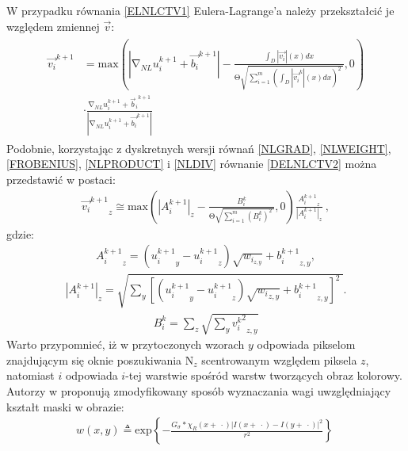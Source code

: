 \documentclass[12pt, twoside, openany]{report}
\theoremstyle{definition}
\begin{document}
W przypadku równania \eqref{ELNLCTV1} Eulera-Lagrange’a należy przekształcić je względem zmiennej $\overrightarrow{v}$:
\begin{align}
\begin{aligned}
{\overrightarrow{v_i}}^{k+1} &= \mathrm{max} \left(\left|{\mathrm{\nabla }}_{NL}u^{k+1}_i+{\overrightarrow{b_i}}^{k+1}\right|-\frac{\int_D{\left|\overrightarrow{v_i}\right|(x)}dx}{\mathrm{\Theta }\sqrt{\sum^m_{i=1}{{\left(\int_D{\left|{\overrightarrow{v_i}}^k\right|(x)}dx\right)}^2}\ }},0\right) \\ 
&\cdot \frac{{\mathrm{\nabla }}_{NL}u^{k+1}_i+{{\overrightarrow{b}}_i}^{k+1}}{\left|{\mathrm{\nabla }}_{NL}u^{k+1}_i+{\overrightarrow{b_i}}^{k+1}\right|}\ 
\label{DELNLCTV2}
\end{aligned}
\end{align}
Podobnie, korzystając z dyskretnych wersji równań \eqref{NLGRAD}, \eqref{NLWEIGHT}, \eqref{FROBENIUS}, \eqref{NLPRODUCT} i \eqref{NLDIV} równanie \eqref{DELNLCTV2} można przedstawić w postaci:
\begin{align}
{{\overrightarrow{v_i}}^{k+1}}_z \cong {\mathrm{max} \left({\left|A^{k+1}_i\right|}_z-\frac{B^k_i}{\mathrm{\Theta }\sqrt{\sum^m_{i=1}{{\left(B^k_i\right)}^2}\ }},0\right)\frac{{A^{k+1}_i}_z}{{\left|A^{k+1}_i\right|}_z}\ },
\label{VNLCTVITER}
\end{align}
gdzie:
\begin{align}
{A^{k+1}_i}_z=\left({u^{k+1}_i}_y-{u^{k+1}_i}_z\right)\sqrt{w_{i_{z,y}}}+{b^{k+1}_i}_{z,y},
\end{align} 
\begin{align}
{\left|A^{k+1}_i\right|}_z=\sqrt{\sum_y{{\left[\left({u^{k+1}_i}_y-{u^{k+1}_i}_z\right)\sqrt{{w_i}_{z,y}}+{b^{k+1}_i}_{z,y}\right]}^2}\ }.
\end{align}
\begin{align}
B^k_i=\sum_z{\sqrt{\sum_y{{{v^k_i}^2}_{z,y}}}}
\end{align}
Warto przypomnieć, iż w przytoczonych wzorach $y$ odpowiada pikselom znajdującym się oknie poszukiwania ${\mathrm{N}}_z$ scentrowanym względem piksela $z$, natomiast $i$ odpowiada $i$-tej warstwie spośród warstw tworzących obraz kolorowy. Autorzy w \cite{jung2011nonlocal} proponują zmodyfikowany sposób wyznaczania wagi uwzględniający kształt maski w obrazie:
\begin{align}
w\left(x,y\right)\triangleq {\mathrm{exp} \left\{-\frac{G_{\sigma }*{\chi }_R\left(x+\ \cdot \right){\left|I\left(x+\ \cdot \right)-I\left(y+\ \cdot \right)\right|}^2}{r^2}\right\}\ }
\label{NLWEIGHTMASK}
\end{align}
\end{document}

